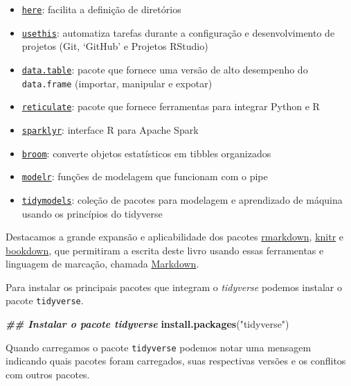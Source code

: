 \documentclass[
]{article}
\newenvironment{Shaded}{\begin{snugshade}}{\end{snugshade}}
\newcommand{\DocumentationTok}[1]{\textcolor[rgb]{0.56,0.35,0.01}{\textbf{\textit{#1}}}}
\newcommand{\FunctionTok}[1]{\textcolor[rgb]{0.13,0.29,0.53}{\textbf{#1}}}
\newcommand{\NormalTok}[1]{#1}
\newcommand{\StringTok}[1]{\textcolor[rgb]{0.31,0.60,0.02}{#1}}
\begin{document}
\begin{itemize}
\item
  \href{https://here.r-lib.org/}{\texttt{here}}: facilita a definição de diretórios
\item
  \href{https://usethis.r-lib.org/}{\texttt{usethis}}: automatiza tarefas durante a configuração e desenvolvimento de projetos (Git, `GitHub' e Projetos RStudio)
\item
  \href{https://rdatatable.gitlab.io/data.table/}{\texttt{data.table}}: pacote que fornece uma versão de alto desempenho do \texttt{data.frame} (importar, manipular e expotar)
\item
  \href{https://rstudio.github.io/reticulate/}{\texttt{reticulate}}: pacote que fornece ferramentas para integrar Python e R
\item
  \href{https://spark.rstudio.com/}{\texttt{sparklyr}}: interface R para Apache Spark
\item
  \href{https://github.com/tidymodels/broom}{\texttt{broom}}: converte objetos estatísticos em tibbles organizados
\item
  \href{https://github.com/tidyverse/modelr}{\texttt{modelr}}: funções de modelagem que funcionam com o pipe
\item
  \href{https://www.tidymodels.org/}{\texttt{tidymodels}}: coleção de pacotes para modelagem e aprendizado de máquina usando os princípios do tidyverse
\end{itemize}

Destacamos a grande expansão e aplicabilidade dos pacotes \href{https://rmarkdown.rstudio.com/}{rmarkdown}, \href{https://yihui.org/knitr/}{knitr} e \href{https://bookdown.org/}{bookdown}, que permitiram a escrita deste livro usando essas ferramentas e linguagem de marcação, chamada \href{https://daringfireball.net/projects/markdown/}{Markdown}.

Para instalar os principais pacotes que integram o \emph{tidyverse} podemos instalar o pacote \texttt{tidyverse}.

\begin{Shaded}
\begin{Highlighting}[]
\DocumentationTok{\#\# Instalar o pacote tidyverse}
\FunctionTok{install.packages}\NormalTok{(}\StringTok{"tidyverse"}\NormalTok{)}
\end{Highlighting}
\end{Shaded}

Quando carregamos o pacote \texttt{tidyverse} podemos notar uma mensagem indicando quais pacotes foram carregados, suas respectivas versões e os conflitos com outros pacotes.
\end{document}
